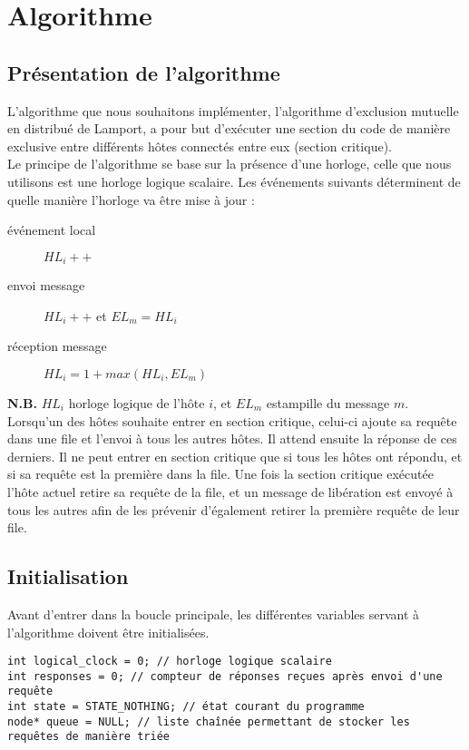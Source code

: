 \section{Algorithme}
\subsection{Présentation de l'algorithme}
L'algorithme que nous souhaitons implémenter, l'algorithme d'exclusion mutuelle en distribué de Lamport, a pour but d'exécuter une section du code de manière exclusive entre différents hôtes connectés entre eux (section critique).\\

Le principe de l'algorithme se base sur la présence d'une horloge, celle que nous utilisons est une horloge logique scalaire. Les événements suivants déterminent de quelle manière l'horloge va être mise à jour :

\begin{description}
    \item[événement local] $HL_i++$
    \item[envoi message] $HL_i++$ et $EL_m = HL_i$
    \item[réception message] $HL_i = 1 + max(HL_i, EL_m)$
\end{description}

\noindent \textbf{N.B.} $HL_i$ horloge logique de l'hôte $i$, et $EL_m$ estampille du message $m$.\\

Lorsqu'un des hôtes souhaite entrer en section critique, celui-ci ajoute sa requête dans une file et l'envoi à tous les autres hôtes. Il attend ensuite la réponse de ces derniers. Il ne peut entrer en section critique que si tous les hôtes ont répondu, et si sa requête est la première dans la file. Une fois la section critique exécutée l'hôte actuel retire sa requête de la file, et un message de libération est envoyé à tous les autres afin de les prévenir d'également retirer la première requête de leur file.

\subsection{Initialisation}
Avant d'entrer dans la boucle principale, les différentes variables servant à l'algorithme doivent être initialisées.

\begin{lstlisting}
int logical_clock = 0; // horloge logique scalaire
int responses = 0; // compteur de réponses reçues après envoi d'une requête
int state = STATE_NOTHING; // état courant du programme
node* queue = NULL; // liste chaînée permettant de stocker les requêtes de manière triée
\end{lstlisting}

